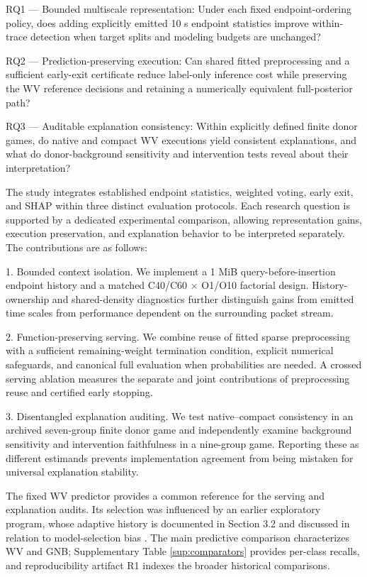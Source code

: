 \documentclass[final,3p,10pt,nopreprintline]{elsarticle}
\begin{document}
RQ1 --- Bounded multiscale representation: Under each fixed endpoint-ordering policy, does adding explicitly emitted 10 s endpoint statistics improve within-trace detection when target splits and modeling budgets are unchanged?

RQ2 --- Prediction-preserving execution: Can shared fitted preprocessing and a sufficient early-exit certificate reduce label-only inference cost while preserving the WV reference decisions and retaining a numerically equivalent full-posterior path?

RQ3 --- Auditable explanation consistency: Within explicitly defined finite donor games, do native and compact WV executions yield consistent explanations, and what do donor-background sensitivity and intervention tests reveal about their interpretation?

The study integrates established endpoint statistics, weighted voting, early exit, and SHAP within three distinct evaluation protocols. Each research question is supported by a dedicated experimental comparison, allowing representation gains, execution preservation, and explanation behavior to be interpreted separately. The contributions are as follows:

1. Bounded context isolation. We implement a 1 MiB query-before-insertion endpoint history and a matched C40/C60 \(\times\) O1/O10 factorial design. History-ownership and shared-density diagnostics further distinguish gains from emitted time scales from performance dependent on the surrounding packet stream.

2. Function-preserving serving. We combine reuse of fitted sparse preprocessing with a sufficient remaining-weight termination condition, explicit numerical safeguards, and canonical full evaluation when probabilities are needed. A crossed serving ablation measures the separate and joint contributions of preprocessing reuse and certified early stopping.

3. Disentangled explanation auditing. We test native--compact consistency in an archived seven-group finite donor game and independently examine background sensitivity and intervention faithfulness in a nine-group game. Reporting these as different estimands prevents implementation agreement from being mistaken for universal explanation stability.

The fixed WV predictor provides a common reference for the serving and explanation audits. Its selection was influenced by an earlier exploratory program, whose adaptive history is documented in Section 3.2 and discussed in relation to model-selection bias \cite{r3,r4}. The main predictive comparison characterizes WV and GNB; Supplementary Table \ref*{sup:comparators} provides per-class recalls, and reproducibility artifact R1 indexes the broader historical comparisons.
\end{document}
